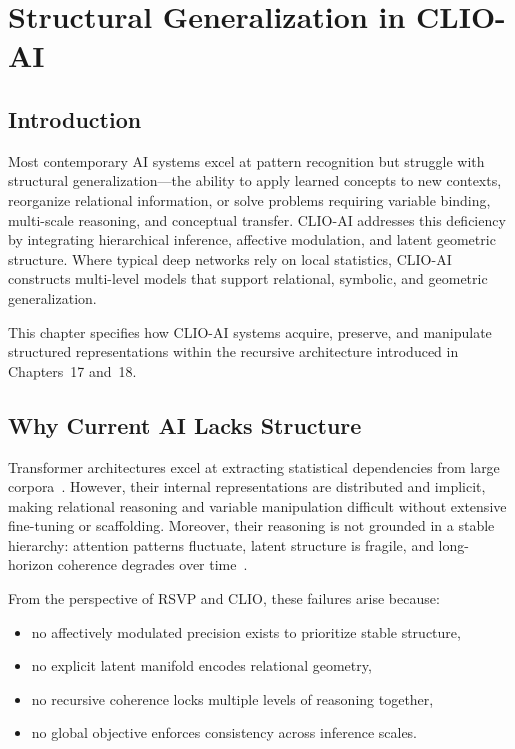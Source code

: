 \documentclass[12pt,oneside]{book}
\theoremstyle{plain}
\theoremstyle{definition}
\let\citep\parencite
\begin{document}
\chapter{Structural Generalization in CLIO-AI}

\section{Introduction}

Most contemporary AI systems excel at pattern recognition but struggle with
structural generalization---the ability to apply learned concepts to new
contexts, reorganize relational information, or solve problems requiring
variable binding, multi-scale reasoning, and conceptual transfer.
CLIO-AI addresses this deficiency by integrating hierarchical inference,
affective modulation, and latent geometric structure.
Where typical deep networks rely on local statistics, CLIO-AI constructs
multi-level models that support relational, symbolic, and geometric
generalization.

This chapter specifies how CLIO-AI systems acquire, preserve, and manipulate
structured representations within the recursive architecture introduced in
Chapters~17 and~18.

\section{Why Current AI Lacks Structure}

Transformer architectures excel at extracting statistical dependencies from
large corpora~\citep{vaswani2017attention}.
However, their internal representations are distributed and implicit,
making relational reasoning and variable manipulation difficult without
extensive fine-tuning or scaffolding.
Moreover, their reasoning is not grounded in a stable hierarchy:
attention patterns fluctuate, latent structure is fragile,
and long-horizon coherence degrades over time~\citep{bubeck2024sparks}.

From the perspective of RSVP and CLIO, these failures arise because:

\begin{itemize}
    \item no affectively modulated precision exists to prioritize stable structure,
    \item no explicit latent manifold encodes relational geometry,
    \item no recursive coherence locks multiple levels of reasoning together,
    \item no global objective enforces consistency across inference scales.
\end{itemize}
\end{document}
